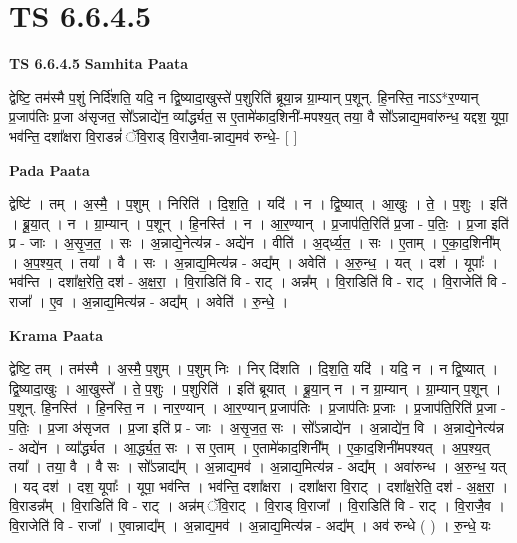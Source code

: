 \documentclass[17pt]{extarticle}
\begin{document}
\section{ TS 6.6.4.5 }

\textbf{TS 6.6.4.5 } \newline
\textbf{Samhita Paata} \newline

द्वेष्टि॒ तम॑स्मै प॒शुं निर्दि॑शति॒ यदि॒ न द्वि॒ष्यादा॒खुस्ते॑ प॒शुरिति॑ ब्रूया॒न्न ग्रा॒म्यान् प॒शून्. हि॒नस्ति॒ नाऽऽ*र॒ण्यान् प्र॒जाप॑तिः प्र॒जा अ॑सृजत॒ सो᳚ऽन्नाद्ये॑न॒ व्या᳚र्द्ध्यत॒ स ए॒तामे॑काद॒शिनी॑-मपश्य॒त् तया॒ वै सो᳚ऽन्नाद्य॒मवा॑रुन्ध॒ यद्दश॒ यूपा॒ भव॑न्ति॒ दशा᳚क्षरा वि॒राडन्नं॑ ॅवि॒राड् वि॒राजै॒वा-न्नाद्य॒मव॑ रुन्धे॒- [  ] \newline

\textbf{Pada Paata} \newline

द्वेष्टि॑ । तम् । अ॒स्मै॒ । प॒शुम् । निरिति॑ । दि॒श॒ति॒ । यदि॑ । न । द्वि॒ष्यात् । आ॒खुः । ते॒ । प॒शुः । इति॑ । ब्रू॒या॒त् । न । ग्रा॒म्यान् । प॒शून् । हि॒नस्ति॑ । न । आ॒र॒ण्यान् । प्र॒जाप॑ति॒रिति॑ प्र॒जा - प॒तिः॒ । प्र॒जा इति॑ प्र - जाः । अ॒सृ॒ज॒त॒ । सः । अ॒न्नाद्ये॒नेत्य॑न्न - अद्ये॑न । वीति॑ । अ॒द्‌र्ध्य॒त॒ । सः । ए॒ताम् । ए॒का॒द॒शिनी᳚म् । अ॒प॒श्य॒त् । तया᳚ । वै । सः । अ॒न्नाद्य॒मित्य॑न्न - अद्य᳚म् । अवेति॑ । अ॒रु॒न्ध॒ । यत् । दश॑ । यूपाः᳚ । भव॑न्ति । दशा᳚क्ष॒रेति॒ दश॑ - अ॒क्ष॒रा॒ । वि॒राडिति॑ वि - राट् । अन्न᳚म् । वि॒राडिति॑ वि - राट् । वि॒राजेति॑ वि - राजा᳚ । ए॒व । अ॒न्नाद्य॒मित्य॑न्न - अद्य᳚म् । अवेति॑ । रु॒न्धे॒ ।  \newline


\textbf{Krama Paata} \newline

द्वेष्टि॒ तम् । तम॑स्मै । अ॒स्मै॒ प॒शुम् । प॒शुम् निः । निर् दि॑शति । दि॒श॒ति॒ यदि॑ । यदि॒ न । न द्वि॒ष्यात् । द्वि॒ष्यादा॒खुः । आ॒खुस्ते᳚ । ते॒ प॒शुः । प॒शुरिति॑ । इति॑ ब्रूयात् । ब्रू॒या॒न् न । न ग्रा॒म्यान् । ग्रा॒म्यान् प॒शून् । प॒शून्. हि॒नस्ति॑ । हि॒नस्ति॒ न । नार॒ण्यान् । आ॒र॒ण्यान् प्र॒जाप॑तिः । प्र॒जाप॑तिः प्र॒जाः । प्र॒जाप॑ति॒रिति॑ प्र॒जा - प॒तिः॒ । प्र॒जा अ॑सृजत । प्र॒जा इति॑ प्र - जाः । अ॒सृ॒ज॒त॒ सः । सो᳚ऽन्नाद्ये॑न । अ॒न्नाद्ये॑न॒ वि । अ॒न्नाद्ये॒नेत्य॑न्न - अद्ये॑न । व्या᳚र्द्ध्यत । आ॒र्द्ध्य॒त॒ सः । स ए॒ताम् । ए॒तामे॑काद॒शिनी᳚म् । ए॒का॒द॒शिनी॑मपश्यत् । अ॒प॒श्य॒त् तया᳚ । तया॒ वै । वै सः । सो᳚ऽन्नाद्य᳚म् । अ॒न्नाद्य॒मव॑ । अ॒न्नाद्य॒मित्य॑न्न - अद्य᳚म् । अवा॑रुन्ध । अ॒रु॒न्ध॒ यत् । यद् दश॑ । दश॒ यूपाः᳚ । यूपा॒ भव॑न्ति । भव॑न्ति॒ दशा᳚क्षरा । दशा᳚क्षरा वि॒राट् । दशा᳚क्ष॒रेति॒ दश॑ - अ॒क्ष॒रा॒ । वि॒राडन्न᳚म् । वि॒राडिति॑ वि - राट् । अन्न॑म् ॅवि॒राट् । वि॒राड् वि॒राजा᳚ । वि॒राडिति॑ वि - राट् । वि॒राजै॒व । वि॒राजेति॑ वि - राजा᳚ । ए॒वान्नाद्य᳚म् । अ॒न्नाद्य॒मव॑ । अ॒न्नाद्य॒मित्य॑न्न - अद्य᳚म् । अव॑ रुन्धे ( ) । रु॒न्धे॒ यः \newline
\end{document}
